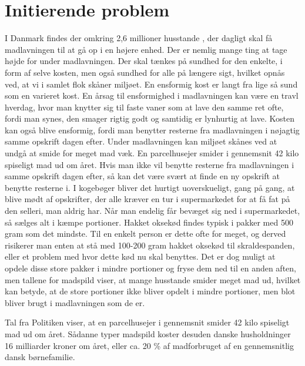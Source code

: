 \section{Initierende problem}
\label{sec:initierendeproblem}

I Danmark findes der omkring 2,6 millioner husstande \cite{husstande}, der dagligt skal få madlavningen til at gå op i en højere enhed. Der er nemlig mange ting at tage højde for under madlavningen. Der skal tænkes på sundhed for den enkelte, i form af selve kosten, men også sundhed for alle på længere sigt, hvilket opnås ved, at vi i samlet flok skåner miljøet.
En ensformig kost er langt fra lige så sund som en varieret kost. En årsag til ensformighed i madlavningen kan være en travl hverdag, hvor man knytter sig til faste vaner som \fx at lave den samme ret ofte, fordi man synes, den smager rigtig godt og samtidig er lynhurtig at lave. Kosten kan også blive ensformig, fordi man benytter resterne fra madlavningen i nøjagtig samme opskrift dagen efter.
Under madlavningen kan miljøet skånes ved at undgå at smide for meget mad væk. En parcelhusejer smider i gennemsnit 42 kilo spiseligt mad ud om året. \cite{madspildpol} Hvis man ikke vil benytte resterne fra madlavningen i samme opskrift dagen efter, så kan det være svært at finde en ny opskrift at benytte resterne i. I kogebøger bliver det hurtigt uoverskueligt, gang på gang, at blive mødt af opskrifter, der alle kræver en tur i supermarkedet for at få fat på den selleri, man aldrig har. Når man endelig får bevæget sig ned i supermarkedet, så sælges alt i kæmpe portioner. Hakket oksekød findes typisk i pakker med 500 gram som det mindste. Til en enkelt person er dette ofte for meget, og derved risikerer man enten at stå med 100-200 gram hakket oksekød til skraldespanden, eller et problem med hvor dette kød nu skal benyttes. Det er dog muligt at opdele disse store pakker i mindre portioner og fryse dem ned til en anden aften, men tallene for madspild viser, at mange husstande smider meget mad ud, hvilket kan betyde, at de store portioner ikke bliver opdelt i mindre portioner, men blot bliver brugt i madlavningen som de er.

Tal fra Politiken viser, at en parcelhusejer i gennemsnit smider 42 kilo spiseligt mad ud om året. \cite{madspildpol}
Sådanne typer madspild koster desuden danske husholdninger 16 milliarder kroner om året, eller ca. 20 \% af madforbruget af en gennemsnitlig dansk børnefamilie. \cite{madspild16}
